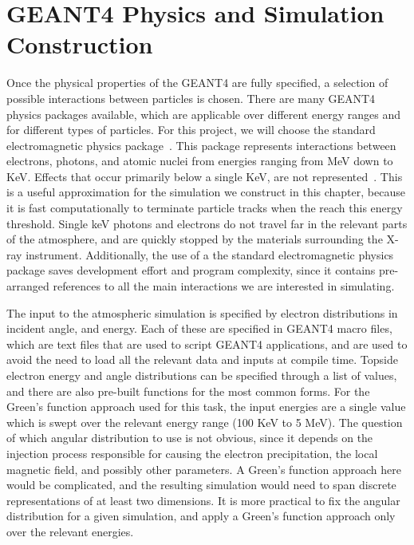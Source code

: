 \section{GEANT4 Physics and Simulation Construction}

Once the physical properties of the GEANT4 are fully specified, a selection of possible interactions between particles is chosen. There are many GEANT4 physics packages available, which are applicable over different energy ranges and for different types of particles. For this project, we will choose the standard electromagnetic physics package~\citep{Burkhardt2004}. This package represents interactions between electrons, photons, and atomic nuclei from energies ranging from MeV down to KeV. Effects that occur primarily below a single KeV, are not represented~\citep{Guatelli2004}. This is a useful approximation for the simulation we construct in this chapter, because it is fast computationally to terminate particle tracks when the reach this energy threshold. Single keV photons and electrons do not travel far in the relevant parts of the atmosphere, and are quickly stopped by the materials surrounding the X-ray instrument. Additionally, the use of a the standard electromagnetic physics package saves development effort and program complexity, since it contains pre-arranged references to all the main interactions we are interested in simulating. 

The input to the atmospheric simulation is specified by electron distributions in incident angle, and energy. Each of these are specified in GEANT4 macro files, which are text files that are used to script GEANT4 applications, and are used to avoid the need to load all the relevant data and inputs at compile time. Topside electron energy and angle distributions can be specified through a list of values, and there are also pre-built functions for the most common forms. For the Green's function approach used for this task, the input energies are a single value which is swept over the relevant energy range (100 KeV to 5 MeV). The question of which angular distribution to use is not obvious, since it depends on the injection process responsible for causing the electron precipitation, the local magnetic field, and possibly other parameters. A Green's function approach here would be complicated, and the resulting simulation would need to span discrete representations of at least two dimensions. It is more practical to fix the angular distribution for a given simulation, and apply a Green's function approach only over the relevant energies. 

